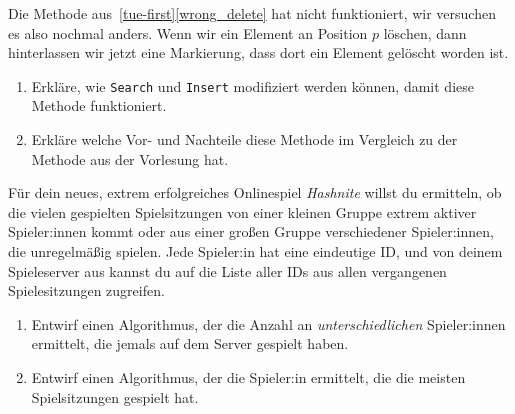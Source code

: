 \documentclass{uebung_cs}
\begin{document}
\begin{aufgabe}
	Die Methode aus~\ref{tue-first}\ref{wrong_delete} hat nicht funktioniert, wir versuchen es also nochmal anders.
	Wenn wir ein Element an Position $p$ löschen, dann hinterlassen wir jetzt eine Markierung, dass dort ein Element gelöscht worden ist.
	\begin{enumerate}
		\item Erkläre, wie \texttt{Search} und \texttt{Insert} modifiziert werden können, damit diese Methode funktioniert.
		\item Erkläre welche Vor- und Nachteile diese Methode im Vergleich zu der Methode aus der Vorlesung hat.
	\end{enumerate}
\end{aufgabe}

\begin{aufgabe}[Spielserverstatistiken]
	Für dein neues, extrem erfolgreiches Onlinespiel \emph{Hashnite} willst du ermitteln, ob die vielen gespielten Spielsitzungen von einer kleinen Gruppe extrem aktiver Spieler:innen kommt oder aus einer großen Gruppe verschiedener Spieler:innen, die unregelmäßig spielen.
	Jede Spieler:in hat eine eindeutige ID, und von deinem Spieleserver aus kannst du auf die Liste aller IDs aus allen vergangenen Spielesitzungen zugreifen.
	\begin{enumerate}
		\item Entwirf einen Algorithmus, der die Anzahl an \emph{unterschiedlichen} Spieler:innen ermittelt, die jemals auf dem Server gespielt haben.
		\item Entwirf einen Algorithmus, der die Spieler:in ermittelt, die die meisten Spielsitzungen gespielt hat.
	\end{enumerate}
\end{aufgabe}
\end{document}

